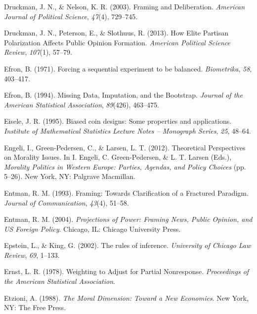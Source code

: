 \documentclass[12pt,econ]{sources/authesis}
\begin{document}
\leavevmode\hypertarget{ref-druckman_2003_framing}{}%
Druckman, J. N., \& Nelson, K. R. (2003). Framing and Deliberation. \emph{American Journal of Political Science}, \emph{47}(4), 729--745.

\leavevmode\hypertarget{ref-druckman_how_2013}{}%
Druckman, J. N., Peterson, E., \& Slothuus, R. (2013). How Elite Partisan Polarization Affects Public Opinion Formation. \emph{American Political Science Review}, \emph{107}(1), 57--79.

\leavevmode\hypertarget{ref-efron_1971_forcing}{}%
Efron, B. (1971). Forcing a sequential experiment to be balanced. \emph{Biometrika}, \emph{58}, 403--417.

\leavevmode\hypertarget{ref-efron_1994_missing}{}%
Efron, B. (1994). Missing Data, Imputation, and the Bootstrap. \emph{Journal of the American Statistical Association}, \emph{89}(426), 463--475.

\leavevmode\hypertarget{ref-eisele_1995_biased}{}%
Eisele, J. R. (1995). Biased coin designs: Some properties and applications. \emph{Institute of Mathematical Statistics Lecture Notes -- Monograph Series}, \emph{25}, 48--64.

\leavevmode\hypertarget{ref-engeli_2012_theoretical}{}%
Engeli, I., Green-Pedersen, C., \& Larsen, L. T. (2012). Theoretical Perspectives on Morality Issues. In I. Engeli, C. Green-Pedersen, \& L. T. Larsen (Eds.), \emph{Morality Politics in Western Europe: Parties, Agendas, and Policy Choices} (pp. 5--26). New York, NY: Palgrave Macmillan.

\leavevmode\hypertarget{ref-entman_framing_1993}{}%
Entman, R. M. (1993). Framing: Towards Clarification of a Fractured Paradigm. \emph{Journal of Communication}, \emph{43}(4), 51--58.

\leavevmode\hypertarget{ref-entman_projections_2004}{}%
Entman, R. M. (2004). \emph{Projections of Power: Framing News, Public Opinion, and US Foreign Policy}. Chicago, IL: Chicago University Press.

\leavevmode\hypertarget{ref-epstein_2002_rules}{}%
Epstein, L., \& King, G. (2002). The rules of inference. \emph{University of Chicago Law Review}, \emph{69}, 1--133.

\leavevmode\hypertarget{ref-ernst_1978_weighting}{}%
Ernst, L. R. (1978). Weighting to Adjust for Partial Nonresponse. \emph{Proceedings of the American Statistical Association}.

\leavevmode\hypertarget{ref-etzioni_moral_1988}{}%
Etzioni, A. (1988). \emph{The Moral Dimension: Toward a New Economics}. New York, NY: The Free Press.
\end{document}

